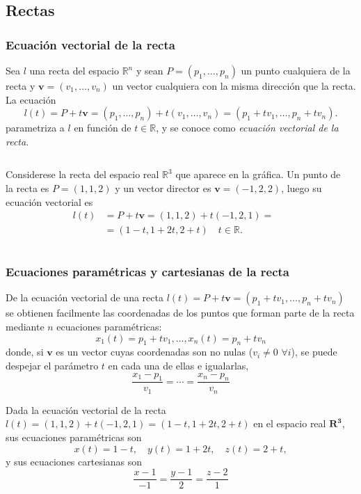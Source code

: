 \subsection{Rectas}
\begin{frame}
\frametitle{Ecuación vectorial de la recta}
\begin{definicion}
Sea $l$ una recta del espacio $\mathbb{R}^n$ y sean $P=(p_1,\ldots,p_n)$ un punto cualquiera de la recta y
$\mathbf{v}=(v_1,\ldots,v_n)$ un vector cualquiera con la misma dirección que la recta.
La ecuación
\[
l(t) = P + t\mathbf{v} = (p_1,\ldots,p_n)+t(v_1,\ldots,v_n) = (p_1+tv_1,\ldots,p_n+tv_n).
\]
parametriza a $l$ en función de $t\in \mathbb{R}$, y se conoce como \emph{ecuación vectorial de la recta}.
\end{definicion}
\begin{columns}
\begin{column}{.48\textwidth}
Considerese la recta del espacio real $\mathbb{R}^3$ que aparece en la gráfica. Un punto de la recta es $P=(1,1,2)$ y un vector director es $\mathbf{v}=(-1,2,2)$, luego su ecuación vectorial es
\begin{align*}
l(t) &=  P + t\mathbf{v} = (1,1,2)+t(-1,2,1) =\\
&= (1-t,1+2t,2+t)\quad t\in\mathbb{R}.
\end{align*}
\end{column}
\begin{column}{.48\textwidth}
\begin{center}
\scalebox{0.8}{}
\end{center}
\end{column}
\end{columns}
\end{frame} 


\begin{frame}
\frametitle{Ecuaciones paramétricas y cartesianas de la recta}
De la ecuación vectorial de una recta $l(t) = P + t\mathbf{v}=(p_1+tv_1,\ldots,p_n+tv_n)$ se obtienen facilmente las coordenadas de los puntos que forman parte de la recta mediante $n$ ecuaciones paramétricas:
\[
x_1(t)=p_1+tv_1, \ldots, x_n(t)=p_n+tv_n
\]
donde, si $\mathbf{v}$ es un vector cuyas coordenadas son no nulas ($v_i\neq 0$ $\forall i$), se puede despejar el parámetro $t$ en cada una de ellas e igualarlas,
\[
\frac{x_1-p_1}{v_1}=\cdots = \frac{x_n-p_n}{v_n}
\] 

Dada la ecuación vectorial de la recta $l(t)=(1,1,2)+t(-1,2,1) =(1-t,1+2t,2+t)$ en el espacio real $\mathbf{R^3}$, sus ecuaciones paramétricas son
\[
x(t) = 1-t, \quad y(t)=1+2t, \quad z(t)=2+t,
\]
y sus ecuaciones cartesianas son
\[
\frac{x-1}{-1}=\frac{y-1}{2}=\frac{z-2}{1}
\]
\end{frame} 



